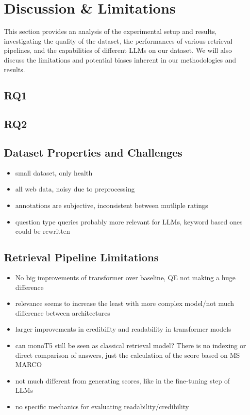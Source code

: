 \chapter{Discussion \& Limitations}\label{discussion}

This section provides an analysis of the experimental setup and results, investigating the quality of the dataset, the performances of various retrieval pipelines, and the capabilities of different LLMs on our dataset.
We will also discuss the limitations and potential biases inherent in our methodologies and results.

\section{RQ1}

\section{RQ2}

\section{Dataset Properties and Challenges}
\begin{itemize}
    \item small dataset, only health
    \item all web data, noisy due to preprocessing
    \item annotations are subjective, inconsistent between mutliple ratings
    \item question type queries probably more relevant for LLMs, keyword based ones could be rewritten
\end{itemize}

\section{Retrieval Pipeline Limitations}
\begin{itemize}
    \item No big improvements of transformer over baseline, QE not making a huge difference
    \item relevance seems to increase the least with more complex model/not much difference between architectures
    \item larger improvements in credibility and readability in transformer models
    \item can monoT5 still be seen as classical retrieval model? There is no indexing or direct comparison of answers, just the calculation of the score based on MS MARCO
    \item not much different from generating scores, like in the fine-tuning step of LLMs
    \item no specific mechanics for evaluating readability/credibility
\end{itemize}



